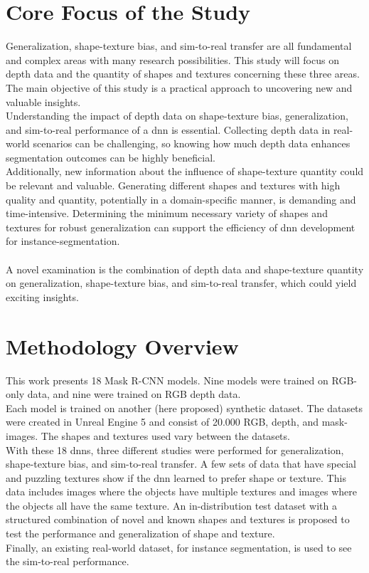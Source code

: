 	\section{Core Focus of the Study}    %
	\label{sec:core-focus-of-the-study}
		Generalization, shape-texture bias, and sim-to-real transfer are all fundamental and complex areas with many research possibilities. This study will focus on depth data and the quantity of shapes and textures concerning these three areas. The main objective of this study is a practical approach to uncovering new and valuable insights.\\
		Understanding the impact of depth data on shape-texture bias, generalization, and sim-to-real performance of a \ac{dnn} is essential. Collecting depth data in real-world scenarios can be challenging, so knowing how much depth data enhances segmentation outcomes can be highly beneficial.\\
		Additionally, new information about the influence of shape-texture quantity could be relevant and valuable. Generating different shapes and textures with high quality and quantity, potentially in a domain-specific manner, is demanding and time-intensive. Determining the minimum necessary variety of shapes and textures for robust generalization can support the efficiency of \ac{dnn} development for instance-segmentation.\\
		\\
		A novel examination is the combination of depth data and shape-texture quantity on generalization, shape-texture bias, and sim-to-real transfer, which could yield exciting insights.
		
	
	
	\section{Methodology Overview}
	\label{sec:methodology-overview}
		This work presents 18 Mask R-CNN \cite{Kaiming2017} models. Nine models were trained on RGB-only data, and nine were trained on RGB depth data.\\
		Each model is trained on another (here proposed) synthetic dataset. The datasets were created in Unreal Engine 5 \cite{Romero2022} and consist of 20.000 RGB, depth, and mask-images. The shapes and textures used vary between the datasets.\\ 
		With these 18 \ac{dnn}s, three different studies were performed for generalization, shape-texture bias, and sim-to-real transfer. A few sets of data that have special and puzzling textures show if the \ac{dnn} learned to prefer shape or texture. This data includes images where the objects have multiple textures and images where the objects all have the same texture. An in-distribution test dataset with a structured combination of novel and known shapes and textures is proposed to test the performance and generalization of shape and texture.\\
		Finally, an existing real-world dataset, for instance segmentation, is used to see the sim-to-real performance.
		
